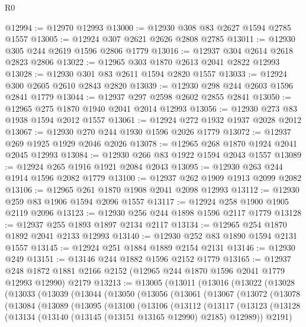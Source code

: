 \begin{lexlean}{R0}
\begin{coremodule}
@12994 := @12970 @12993
@13000 := @12930 @308 @83 @2627 @1594 @2785 @1557
@13005 := @12924 @307 @2621 @2626 @2808 @2785
@13011 := @12930 @305 @244 @2619 @1596 @2806 @1779
@13016 := @12937 @304 @2614 @2618 @2823 @2806
@13022 := @12965 @303 @1870 @2613 @2041 @2822 @12993
@13028 := @12930 @301 @83 @2611 @1594 @2820 @1557
@13033 := @12924 @300 @2605 @2610 @2843 @2820
@13039 := @12930 @298 @244 @2603 @1596 @2841 @1779
@13044 := @12937 @297 @2598 @2602 @2855 @2841
@13050 := @12965 @275 @1870 @1940 @2041 @2014 @12993
@13056 := @12930 @273 @83 @1938 @1594 @2012 @1557
@13061 := @12924 @272 @1932 @1937 @2028 @2012
@13067 := @12930 @270 @244 @1930 @1596 @2026 @1779
@13072 := @12937 @269 @1925 @1929 @2046 @2026
@13078 := @12965 @268 @1870 @1924 @2041 @2045 @12993
@13084 := @12930 @266 @83 @1922 @1594 @2043 @1557
@13089 := @12924 @265 @1916 @1921 @2084 @2043
@13095 := @12930 @263 @244 @1914 @1596 @2082 @1779
@13100 := @12937 @262 @1909 @1913 @2099 @2082
@13106 := @12965 @261 @1870 @1908 @2041 @2098 @12993
@13112 := @12930 @259 @83 @1906 @1594 @2096 @1557
@13117 := @12924 @258 @1900 @1905 @2119 @2096
@13123 := @12930 @256 @244 @1898 @1596 @2117 @1779
@13128 := @12937 @255 @1893 @1897 @2134 @2117
@13134 := @12965 @254 @1870 @1892 @2041 @2133 @12993
@13140 := @12930 @252 @83 @1890 @1594 @2131 @1557
@13145 := @12924 @251 @1884 @1889 @2154 @2131
@13146 := @12930 @249
@13151 := @13146 @244 @1882 @1596 @2152 @1779
@13165 := @12937
    @248
    @1872
    @1881
    @2166
    @2152
    (@12965 @244 @1870 @1596 @2041 @1779 @12993 @12990)
    @2179
@13213 := @13005
    (@13011
      (@13016
        (@13022
          (@13028
            (@13033
              (@13039
                (@13044
                  (@13050
                    (@13056
                      (@13061
                        (@13067
                          (@13072
                            (@13078
                              (@13084
                                (@13089
                                  (@13095
                                    (@13100
                                      (@13106
                                        (@13112
                                          (@13117
                                            (@13123
                                              (@13128
                                                (@13134
                                                  (@13140
                                                    (@13145 (@13151 @13165 @12990) @2185)
                                                    @12989))
                                                @2191)

\end{coremodule}
\end{lexlean}
